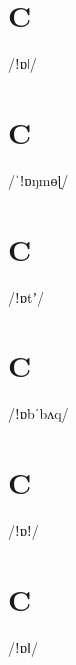 \documentclass[10pt,a4paper,twoside]{book}
\begin{document}
\section*{C}

\begin{multicols}{3}
 {/ǃɒǀ/} {}
\end{multicols}

\section*{C}

\begin{multicols}{3}
 {/ˈǃɒŋmɵɭ/} {}
\end{multicols}

\section*{C}

\begin{multicols}{3}
 {/ǃɒtʼ/} {}
\end{multicols}

\section*{C}

\begin{multicols}{3}
 {/ǃɒbˈbʌq/} {}
\end{multicols}

\section*{C}

\begin{multicols}{3}
 {/ǃɒǃ/} {}
\end{multicols}

\section*{C}

\begin{multicols}{3}
 {/ǃɒǁ/} {}
\end{multicols}
\end{document}
